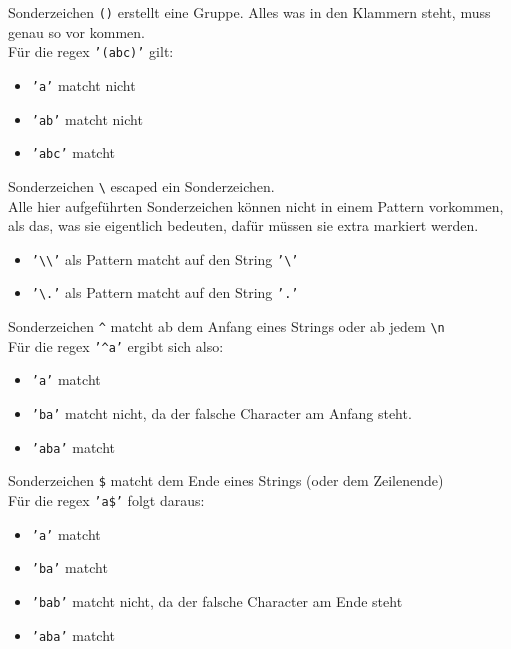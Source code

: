 \begin{frame}{Sonderzeichen}
	\texttt{()} erstellt eine Gruppe. Alles was in den Klammern steht, muss genau so vor kommen.\\[.25cm]
	Für die regex \texttt{'(abc)'} gilt:\\
	\begin{itemize}
		\item \texttt{'a'} matcht nicht
		\item \texttt{'ab'} matcht nicht
		\item \texttt{'abc'} matcht
	\end{itemize}
\end{frame}

\begin{frame}{Sonderzeichen}
	\texttt{\textbackslash} escaped ein Sonderzeichen.\\[.25cm]
	Alle hier aufgeführten Sonderzeichen können nicht in einem Pattern vorkommen, als das, was sie eigentlich bedeuten, dafür müssen sie extra markiert werden.\\
	\begin{itemize}
		\item \texttt{'\textbackslash\textbackslash'} als Pattern matcht auf den String \texttt{'\textbackslash'}
		\item \texttt{'\textbackslash.'} als Pattern matcht auf den String \texttt{'.'}
	\end{itemize}
\end{frame}

\begin{frame}{Sonderzeichen}
	\texttt{\^} matcht ab dem Anfang eines Strings oder ab jedem \texttt{\textbackslash{}n}\\[.25cm]
	Für die regex \texttt{'\^{}a'} ergibt sich also:\\
	\begin{itemize}
		\item \texttt{'a'} matcht
		\item \texttt{'ba'} matcht nicht, da der falsche Character am Anfang steht.
		\item \texttt{'aba'} matcht
	\end{itemize}	
\end{frame}

\begin{frame}{Sonderzeichen}
	\texttt{\$} matcht dem Ende eines Strings (oder dem Zeilenende)\\[.25cm]
	Für die regex \texttt{'a\$'} folgt daraus:\\
	\begin{itemize}
		\item \texttt{'a'} matcht
		\item \texttt{'ba'} matcht
		\item \texttt{'bab'} matcht nicht, da der falsche Character am Ende steht
		\item \texttt{'aba'} matcht
	\end{itemize}
\end{frame}

